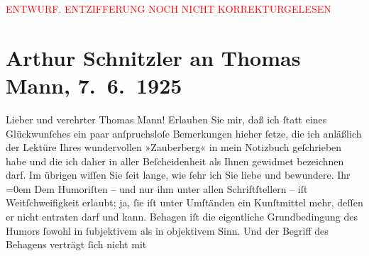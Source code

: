 
\begin{center}
            \textcolor{red}{ENTWURF. ENTZIFFERUNG NOCH NICHT KORREKTURGELESEN}
                      \end{center}
            
               \section[Arthur Schnitzler an Thomas Mann, 7. 6. 1925]{ Arthur Schnitzler an Thomas Mann, 7. 6. 1925}\nopagebreak{}\rehead{ }\begin{ledgroupsized}[t]{13cm}\normalsize\beginnumbering{} \toendnotes[C]{\smallbreak\pagebreak[2]} \pstart\center{}{\pb}Lieber und verehrter Thomas Mann!\pend\pstart
           Erlauben Sie mir, daß ich ſtatt eines Glückwunſches ein paar anſpruchsloſe
               Bemerkungen hieher ſetze, die ich anläßlich der Lektüre Ihres wundervollen »Zauberberg« in mein Notizbuch geſchrieben habe
               und die ich daher in aller Beſcheidenheit als Ihnen gewidmet bezeichnen darf. Im
               übrigen wiſſen Sie ſeit lange, wie ſehr ich Sie liebe und bewundere.\pend
           \pstart
           Ihr{\\[\baselineskip]}\spacefill\mbox{}\pend
           \leftskip=0em{}\pstart
           \noindent{}Dem Humoriſten – und nur ihm unter allen Schriftſtellern – iſt Weitſchweifigkeit
                  erlaubt; ja, ſie iſt unter Umſtänden ein Kunſtmittel mehr, deſſen er nicht
                  entraten darf und kann.\pend
           \pstart
           Behagen iſt die eigentliche Grundbedingung des Humors ſowohl in ſubjektivem als in
                  objektivem Sinn. Und der Begriff des Behagens verträgt ſich nicht mit

\end{ledgroupsized}
